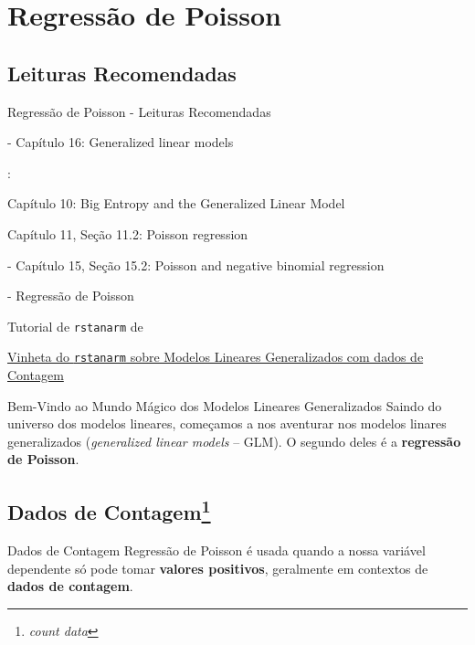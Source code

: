 \section{Regressão de Poisson}

\subsection{Leituras Recomendadas}
\begin{frame}{Regressão de Poisson - Leituras Recomendadas}
    \begin{vfilleditems}
        \item \textcite{gelman2013bayesian} - Capítulo 16: Generalized linear models
        \item \textcite{mcelreath2020statistical}:
        \begin{vfilleditems}
            \item Capítulo 10: Big Entropy and the Generalized Linear Model
            \item Capítulo 11, Seção 11.2: Poisson regression
        \end{vfilleditems}
        \item \textcite{gelman2020regression} - Capítulo 15, Seção 15.2: Poisson and negative binomial regression
        \item \textcite{storopoli2021estatisticabayesianaR} - Regressão de Poisson
        \item Tutorial de \texttt{rstanarm} de \textcite{muth2018user}
        \item \href{http://mc-stan.org/rstanarm/articles/count.html}{Vinheta do \texttt{rstanarm} sobre Modelos Lineares Generalizados com dados de Contagem}
    \end{vfilleditems}
\end{frame}

\begin{frame}{Bem-Vindo ao Mundo Mágico dos Modelos Lineares Generalizados}
    Saindo do universo dos modelos lineares, começamos a nos aventurar nos modelos
    linares generalizados (\textit{generalized linear models} -- GLM).
    \vfill
    O segundo deles é a \textbf{regressão de Poisson}.
\end{frame}

\subsection{Dados de Contagem\footnote{\textit{count data}}}
\begin{frame}{Dados de Contagem}
    Regressão de Poisson é usada quando a nossa variável dependente só pode
    tomar \textbf{valores positivos}, geralmente em contextos de
    \textbf{dados de contagem}.
\end{frame}

